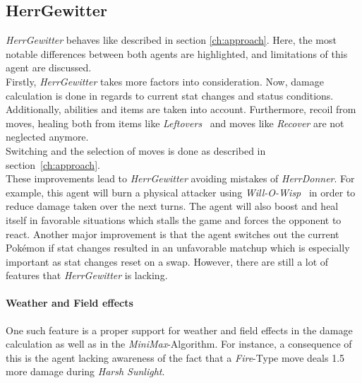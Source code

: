 \subsection{HerrGewitter}
\label{sec:HerrGewitter}
\textit{HerrGewitter} behaves like described in section \ref{ch:approach}. Here, the most notable
differences between both agents are highlighted, and limitations of this agent are discussed. \\
Firstly, \textit{HerrGewitter} takes more factors into consideration. Now, damage calculation is done
in regards to current stat changes and status conditions. Additionally, abilities and items are taken 
into account. Furthermore, recoil from moves, healing both from items
like \textit{Leftovers}~\autocite{Bulbapedia:Leftovers} and moves like \textit{Recover} are not neglected
anymore. \\
Switching and the selection of moves is done as described in section~\ref{ch:approach}. \\
These improvements lead to \textit{HerrGewitter} avoiding mistakes of \textit{HerrDonner}. For example,
this agent will burn a physical attacker using \textit{Will-O-Wisp}~\autocite{Bulbapedia:WillOWisp}
in order to reduce damage taken over the next turns. The agent will also boost and heal itself in favorable
situations which stalls the game and forces the opponent to react. Another major improvement is that the
agent switches out the current Pokémon if stat changes resulted in an unfavorable matchup which is especially
important as stat changes reset on a swap. However, there are still a lot of features that \textit{HerrGewitter} 
is lacking. 

\paragraph{Weather and Field effects}
One such feature is a proper support for weather and field effects in the damage calculation as well
as in the \textit{MiniMax}-Algorithm. For instance, a consequence of this is the agent lacking awareness
of the fact that a \textit{Fire}-Type move deals 1.5 more damage during \textit{Harsh Sunlight}.

